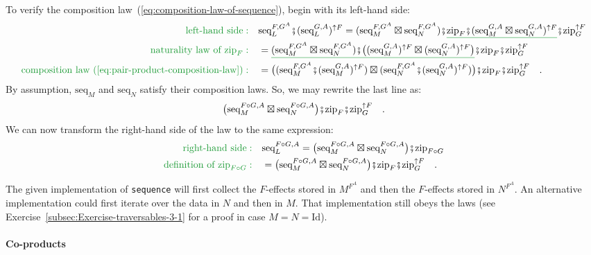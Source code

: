 To verify the composition law~(\ref{eq:composition-law-of-sequence}),
begin with its left-hand side:
\begin{align*}
{\color{greenunder}\text{left-hand side}:}\quad & \text{seq}_{L}^{F,G^{A}}\bef(\text{seq}_{L}^{G,A})^{\uparrow F}=(\text{seq}_{M}^{F,G^{A}}\boxtimes\text{seq}_{N}^{F,G^{A}})\bef\gunderline{\text{zip}_{F}\bef(\text{seq}_{M}^{G,A}\boxtimes\text{seq}_{N}^{G,A})^{\uparrow F}}\bef\text{zip}_{G}^{\uparrow F}\\
{\color{greenunder}\text{naturality law of }\text{zip}_{F}:}\quad & =\gunderline{(\text{seq}_{M}^{F,G^{A}}\boxtimes\text{seq}_{N}^{F,G^{A}})\bef\big((\text{seq}_{M}^{G,A})^{\uparrow F}\boxtimes(\text{seq}_{N}^{G,A})^{\uparrow F}\big)}\bef\text{zip}_{F}\bef\text{zip}_{G}^{\uparrow F}\\
{\color{greenunder}\text{composition law~(\ref{eq:pair-product-composition-law})}:}\quad & =\big((\text{seq}_{M}^{F,G^{A}}\bef(\text{seq}_{M}^{G,A})^{\uparrow F})\boxtimes(\text{seq}_{N}^{F,G^{A}}\bef(\text{seq}_{N}^{G,A})^{\uparrow F})\big)\bef\text{zip}_{F}\bef\text{zip}_{G}^{\uparrow F}\quad.
\end{align*}
By assumption, $\text{seq}_{M}$ and $\text{seq}_{N}$ satisfy their
composition laws. So, we may rewrite the last line as:
\[
\big(\text{seq}_{M}^{F\circ G,A}\boxtimes\text{seq}_{N}^{F\circ G,A}\big)\bef\text{zip}_{F}\bef\text{zip}_{G}^{\uparrow F}\quad.
\]
We can now transform the right-hand side of the law to the same expression:
\begin{align*}
{\color{greenunder}\text{right-hand side}:}\quad & \text{seq}_{L}^{F\circ G,A}=\big(\text{seq}_{M}^{F\circ G,A}\boxtimes\text{seq}_{N}^{F\circ G,A}\big)\bef\text{zip}_{F\circ G}\\
{\color{greenunder}\text{definition of }\text{zip}_{F\circ G}:}\quad & =\big(\text{seq}_{M}^{F\circ G,A}\boxtimes\text{seq}_{N}^{F\circ G,A}\big)\bef\text{zip}_{F}\bef\text{zip}_{G}^{\uparrow F}\quad.
\end{align*}

The given implementation of \lstinline!sequence! will first collect
the $F$-effects stored in $M^{F^{A}}$ and then the $F$-effects
stored in $N^{F^{A}}$. An alternative implementation could first
iterate over the data in $N$ and then in $M$. That implementation
still obeys the laws (see Exercise~\ref{subsec:Exercise-traversables-3-1}
for a proof in case $M=N=\text{Id}$).

\paragraph{Co-products}

